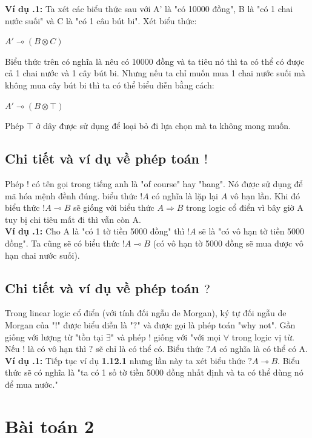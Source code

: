 \documentclass[a4paper]{article}
\begin{document}
\textbf{Ví dụ \thesubsection.1:} Ta xét các biểu thức sau với A' là "có 10000 đồng", B là "có 1 chai nước suối" và C là "có 1 câu bút bi". Xét biểu thức:\\
\begin{center}
    $A' \multimap (B \otimes C)$
\end{center}
Biểu thức trên có nghĩa là nêu có 10000 đồng và ta tiêu nó thì ta có thể có được cả 1 chai nước và 1 cây bút bi. Nhưng nếu ta chỉ muốn mua 1 chai nước suối mà không mua cây bút bi thì ta có thể biểu diễn bằng cách:\\
\begin{center}
    $A' \multimap (B \otimes \top)$
\end{center}
Phép $\top$ ở dây được sử dụng để loại bỏ đi lựa chọn mà ta không mong muốn.

\subsection{Chi tiết và ví dụ về phép toán $!$} 
Phép $!$ có tên gọi trong tiếng anh là "of course" hay "bang". Nó được sử dụng để mã hóa mệnh đềnh đúng. biểu thức $!A$ có nghĩa là lặp lại $A$ vô hạn lần. Khi đó biểu thức $!A \multimap B$ sẽ giống với biểu thức $A \Rightarrow B$ trong logic cổ điển vì bây giờ A tuy bị chi tiêu mất đi thì vẫn còn A.\\

\textbf{Ví dụ \thesubsection.1:} Cho A là "có 1 tờ tiền 5000 đồng" thì $!A$ sẽ là "có vô hạn tờ tiền 5000 đồng". Ta cũng sẽ có biểu thức $!A \multimap B$ (có vô hạn tờ 5000 đồng sẽ mua được vô hạn chai nước suối).

\subsection{Chi tiết và ví dụ về phép toán $?$}
Trong linear logic cổ điển (với tính đối ngẫu de Morgan), ký tự đối ngẫu de Morgan của "$!$" được biểu diễn là "$?$" và được gọi là phép toán "why not". Gần giống với lượng từ "tồn tại $\exists$" và phép $!$ giống với "với mọi $\forall$ trong logic vị từ. Nếu $!$ là có vô hạn thì $?$ sẽ chỉ là có thể có. Biểu thức $?A$ có nghĩa là có thể có A.\\

\textbf{Ví dụ \thesubsection.1:} Tiếp tục ví dụ \textbf{1.12.1} nhưng lần này ta xét biểu thức $?A \multimap B$. Biểu thức sẽ có nghĩa là "ta có 1 số tờ tiền 5000 đồng nhất định và ta có thể dùng nó để mua nước."

\section{Bài toán 2}
\end{document}
